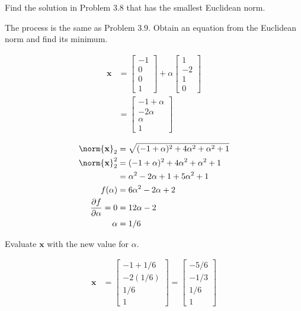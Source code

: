 \item[3.10] Find the solution in Problem 3.8 that has the smallest Euclidean norm.

The process is the same as Problem 3.9.
Obtain an equation from the Euclidean norm and find its minimum.

\begin{align*}
 \mathbf{x} &= \begin{bmatrix} -1 \\ 0 \\0 \\1 \end{bmatrix}
        + \alpha \begin{bmatrix}1\\ -2\\ 1\\ 0 \end{bmatrix}\\
        &=\begin{bmatrix}
         -1 + \alpha \\
         -2\alpha \\
         \alpha \\
         1
        \end{bmatrix}
\end{align*}

\begin{align*}
\norm{\mathbf{x}}_2 &= \sqrt{(-1+\alpha)^2 + 4\alpha^2 + \alpha^2 +1}\\
\norm{\mathbf{x}}_2^2  &= (-1+\alpha)^2 + 4\alpha^2 + \alpha^2 +1 \\
&= \alpha^2 -2 \alpha +1 +5 \alpha^2 +1\\
f(\alpha) &= 6 \alpha^2 -2 \alpha +2\\
\frac{\partial f}{\partial \alpha} = 0 &= 12 \alpha -2\\
\alpha &= 1/6
\end{align*}

Evaluate $\mathbf{x}$ with the new value for $\alpha$.

\begin{align*}
 \mathbf{x} &=
    \begin{bmatrix}
         -1 + 1/6 \\
         -2(1/6) \\
         1/6 \\
         1
        \end{bmatrix}
        =
        \begin{bmatrix}
        -5/6\\-1/3\\1/6\\1
        \end{bmatrix}
\end{align*}
